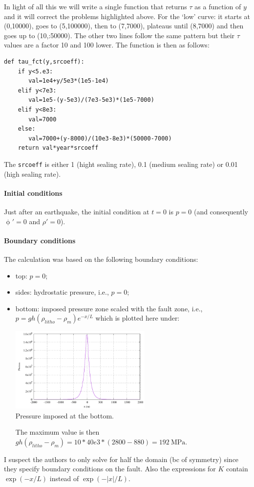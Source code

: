 In light of all this we will write a single function that returns $\tau$ as a function of $y$
and it will correct the problems highlighted above. 
For the `low' curve: it starts at (0,10000), goes to (5,100000), then to (7,7000), plateaus
until (8,7000) and then goes up to (10,:50000).
The other two lines follow the same pattern but their $\tau$ values are a factor 10 and 100 lower.
The function is then as follows:
\begin{lstlisting}
def tau_fct(y,srcoeff):
    if y<5.e3:
       val=1e4+y/5e3*(1e5-1e4)
    elif y<7e3:
       val=1e5-(y-5e3)/(7e3-5e3)*(1e5-7000)
    elif y<8e3:
       val=7000
    else:
       val=7000+(y-8000)/(10e3-8e3)*(50000-7000)
    return val*year*srcoeff
\end{lstlisting}
The \lstinline{srcoeff} is either 1 (hight sealing rate), 0.1 (medium sealing rate)
or 0.01 (high sealing rate).


\paragraph{Initial conditions}

Just after an earthquake, the initial condition at $t=0$ is $p=0$ (and consequently 
$\upphi'=0$  and $\rho'=0$).

\paragraph{Boundary conditions}

The calculation was based on the following boundary conditions: 
\begin{itemize}
\item top: $p=0$;
\item sides:  hydrostatic pressure, i.e., $p=0$;
\item bottom: imposed pressure zone scaled
with the fault zone, i.e., $p = g h (\rho_{litho} -\rho_m) e^{-x/L}$ which is plotted here under: 
\begin{center}
\includegraphics[width=7cm]{python_codes/fieldstone_126/images/pbottom}\\
{\captionfont Pressure imposed at the bottom.}
\end{center}
The maximum value is then $g h (\rho_{litho} -\rho_m) =10*40e3*(2800-880)=192~\si{\mega\pascal}$.

\end{itemize}
I suspect the authors to only solve for half the domain (bc of symmetry) since they 
specify boundary conditions on the fault. Also the expressions for $K$ contain $\exp(-x/L)$
instead of $\exp(-|x|/L)$.



